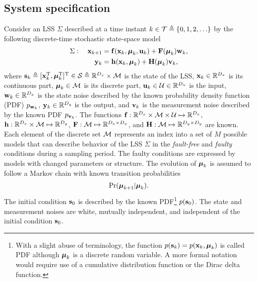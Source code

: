 \documentclass[conference,letterpaper]{IEEEtran}
\begin{document}
\subsection{System specification}\label{sec:system_specification}
Consider an LSS $\Sigma$ described at a time instant $k\in\mathcal{T}\triangleq\{0,1,2,\ldots\}$ by the following discrete-time stochastic state-space model
\begin{subequations}\label{ali:LSS}
	\begin{align}
		\Sigma: \quad  \mathbf{x}_{k+1} & =\mathbf{f}(\mathbf{x}_k,\boldsymbol{\mu}_k,\mathbf{u}_k)+\mathbf{F}(\boldsymbol{\mu}_k)\mathbf{w}_k, \label{ali:LSSdynamics} \\
		\mathbf{y}_{k} & =\mathbf{h}(\mathbf{x}_k,\boldsymbol{\mu}_k)+\mathbf{H}(\boldsymbol{\mu}_k)\mathbf{v}_k, \label{ali:LSSmeasurement}
	\end{align}
\end{subequations}
where $\mathbf{s}_{k} \triangleq [\mathbf{x}^{\text{T}}_{k},\boldsymbol{\mu}^{\text{T}}_{k}]^{\text{T}} \in \mathcal{S} \triangleq \mathbb{R}^{D_x} \times \mathcal{M}$ is the state of the LSS, $\mathbf{x}_k\in\mathbb{R}^{D_x}$ is its continuous part, $\boldsymbol{\mu}_k\in\mathcal{M}$ is its discrete part, $\mathbf{u}_{k}\in\mathcal{U}\in\mathbb{R}^{D_u}$ is the input, $\mathbf{w}_k\in\mathbb{R}^{D_x}$ is the state noise described by the known probability density function (PDF) $p_{\mathbf{w}_k}$, $\mathbf{y}_k\in\mathbb{R}^{D_y}$ is the output, and $\mathbf{v}_k$ is the measurement noise described by the known PDF $p_{\mathbf{v}_k}$. 
The functions $\mathbf{f}: \mathbb{R}^{D_x}\times\mathcal{M}\times\mathcal{U}\mapsto\mathbb{R}^{D_x}$, $\mathbf{h}: \mathbb{R}^{D_x}\times\mathcal{M}\mapsto\mathbb{R}^{D_y}$, $\mathbf{F}: \mathcal{M}\mapsto \mathbb{R}^{D_x\times D_x}$, and $\mathbf{H}: \mathcal{M}\mapsto \mathbb{R}^{D_y\times D_y}$ are known. 
Each element of the discrete set $\mathcal{M}$ represents an index into a set of $M$ possible models that can describe behavior of the LSS $\Sigma$ in the \emph{fault-free} and \emph{faulty} conditions during a sampling period. 
The faulty conditions are expressed by models with changed parameters or structure. 
The evolution of $\boldsymbol{\mu}_k$ is assumed to follow a Markov chain with known transition probabilities
\begin{align}
	\Pr(\boldsymbol{\mu}_{k+1}\vert\boldsymbol{\mu}_{k}). \label{ali:LSStransition}
\end{align}
The initial condition $\mathbf{s}_{0}$ is described by the known PDF\footnote{With a slight abuse of terminology, the function $p(\mathbf{s}_{k}) = p(\mathbf{x}_{k}, \boldsymbol{\mu}_{k})$ is called PDF although $\boldsymbol{\mu}_{k}$ is a discrete random variable. 
A more formal notation would require use of a cumulative distribution function or the Dirac delta function.} $p(\mathbf{s}_{0})$. 
The state and measurement noises are white, mutually independent, and independent of the initial condition $\mathbf{s}_{0}$. 
\end{document}
